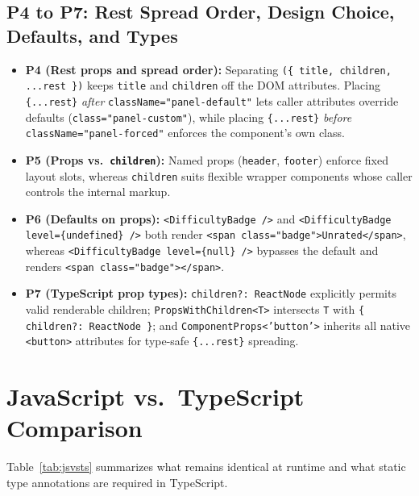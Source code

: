 \documentclass[11pt, a4paper]{article}
\begin{document}
\subsection{P4 to P7: Rest Spread Order, Design Choice, Defaults, and Types}
\begin{itemize}
  \item \textbf{P4 (Rest props and spread order):} Separating \texttt{(\{ title, children, ...rest \})} keeps \texttt{title} and \texttt{children} off the DOM attributes. Placing \texttt{\{...rest\}} \emph{after} \texttt{className="panel-default"} lets caller attributes override defaults (\texttt{class="panel-custom"}), while placing \texttt{\{...rest\}} \emph{before} \texttt{className="panel-forced"} enforces the component's own class.
  \item \textbf{P5 (Props vs.\ \texttt{children}):} Named props (\texttt{header}, \texttt{footer}) enforce fixed layout slots, whereas \texttt{children} suits flexible wrapper components whose caller controls the internal markup.
  \item \textbf{P6 (Defaults on props):} \texttt{<DifficultyBadge />} and \texttt{<DifficultyBadge level=\{undefined\} />} both render \texttt{<span class="badge">Unrated</span>}, whereas \texttt{<DifficultyBadge level=\{null\} />} bypasses the default and renders \texttt{<span class="badge"></span>}.
  \item \textbf{P7 (TypeScript prop types):} \texttt{children?: ReactNode} explicitly permits valid renderable children; \texttt{PropsWithChildren<T>} intersects \texttt{T} with \texttt{\{ children?: ReactNode \}}; and \texttt{ComponentProps<'button'>} inherits all native \texttt{<button>} attributes for type-safe \texttt{\{...rest\}} spreading.
\end{itemize}

\section{JavaScript vs.\ TypeScript Comparison}

Table~\ref{tab:jsvsts} summarizes what remains identical at runtime and what static type annotations are required in TypeScript.
\end{document}
